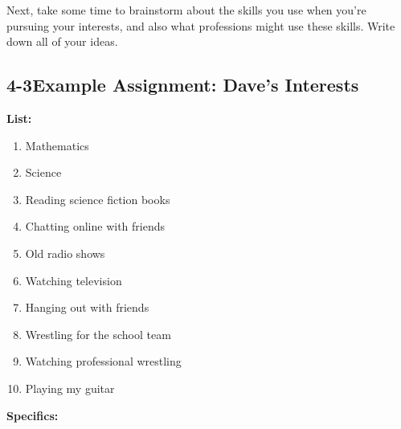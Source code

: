 Next, take some time to brainstorm about the skills you use when you're pursuing your interests, and also what professions might use these skills. Write down all of your ideas.
\pagebreak \subsection*{4-3\quad Example Assignment: Dave's Interests}
\textbf{List:}
\begin{enumerate}[leftmargin=*]
\item Mathematics
\item Science
\item Reading science fiction books
\item Chatting online with friends
\item Old radio shows
\item Watching television
\item Hanging out with friends
\item Wrestling for the school team
\item Watching professional wrestling
\item Playing my guitar
\end{enumerate}
\textbf{Specifics:}
